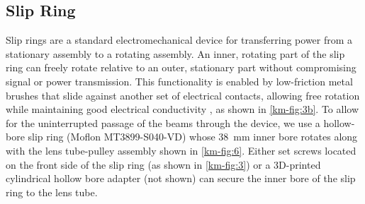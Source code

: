 \subsection{Slip Ring}

Slip rings are a standard electromechanical device for transferring power from a stationary assembly to a rotating assembly.
An inner, rotating part of the slip ring can freely rotate relative to an outer, stationary part without compromising signal or power transmission.
This functionality is enabled by low-friction metal brushes that slide against another set of electrical contacts, allowing free rotation while maintaining good electrical conductivity \citep{argibay_asymmetric_2010}, as shown in \cref{km-fig:3b}.
To allow for the uninterrupted passage of the beams through the device, we use a hollow-bore slip ring (Moflon MT3899-S040-VD) whose \qty{38}{mm} inner bore rotates along with the lens tube-pulley assembly shown in \cref{km-fig:6}.
Either set screws located on the front side of the slip ring (as shown in \cref{km-fig:3}) or a 3D-printed cylindrical hollow bore adapter (not shown) can secure the inner bore of the slip ring to the lens tube.

